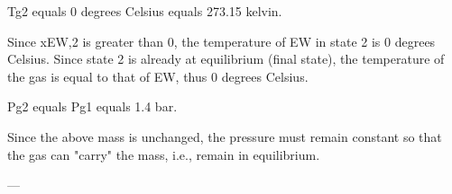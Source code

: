 Tg2 equals 0 degrees Celsius equals 273.15 kelvin.  

Since xEW,2 is greater than 0, the temperature of EW in state 2 is 0 degrees Celsius. Since state 2 is already at equilibrium (final state), the temperature of the gas is equal to that of EW, thus 0 degrees Celsius.  

Pg2 equals Pg1 equals 1.4 bar.  

Since the above mass is unchanged, the pressure must remain constant so that the gas can "carry" the mass, i.e., remain in equilibrium.  

---